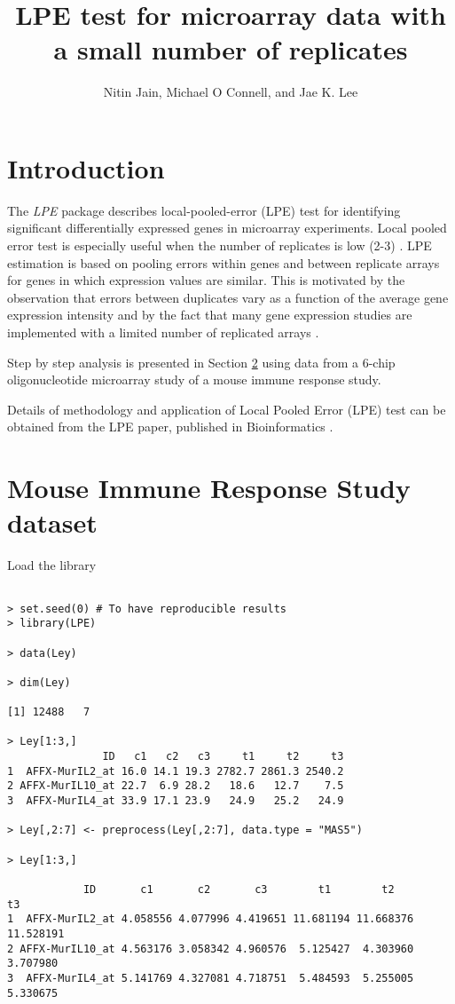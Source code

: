 \documentclass[12pt]{article}
\author{Nitin Jain, Michael O Connell, and Jae K. Lee}
\newcommand{\Rpackage}[1]{{\textit{#1}}}
\begin{document}
\title{LPE test for microarray data with a small number of replicates}

\maketitle
\tableofcontents

\section{Introduction}
The \Rpackage{LPE} package describes local-pooled-error (LPE) 
test for identifying significant differentially expressed 
genes in microarray experiments. Local pooled error test is
 especially useful when the number of replicates is low (2-3)
\cite{Jain:2003}.
 LPE estimation is based on pooling errors within
genes and between replicate arrays for genes in which expression
values are similar. This is motivated by the observation that
errors between duplicates vary as a function of the average gene
expression intensity and by the fact that many gene expression
studies are implemented with a limited number of replicated arrays
\cite{Chen:1997}.

Step by step analysis is presented in Section \ref{sec:analysis} 
using data from a 6-chip oligonucleotide microarray study of a mouse immune response study.

Details of methodology and application of Local Pooled Error (LPE) test 
can be obtained from the LPE paper, published in Bioinformatics
\cite{Jain:2003}.


\section{Mouse Immune Response Study dataset}
\label{sec:analysis}
Load the library
\begin{verbatim}

> set.seed(0) # To have reproducible results
> library(LPE) 

> data(Ley)

> dim(Ley)

[1] 12488	7

> Ley[1:3,]
               ID   c1   c2   c3     t1     t2     t3
1  AFFX-MurIL2_at 16.0 14.1 19.3 2782.7 2861.3 2540.2
2 AFFX-MurIL10_at 22.7  6.9 28.2   18.6   12.7    7.5
3  AFFX-MurIL4_at 33.9 17.1 23.9   24.9   25.2   24.9

> Ley[,2:7] <- preprocess(Ley[,2:7], data.type = "MAS5")

> Ley[1:3,]

            ID       c1       c2       c3        t1        t2        t3
1  AFFX-MurIL2_at 4.058556 4.077996 4.419651 11.681194 11.668376 11.528191
2 AFFX-MurIL10_at 4.563176 3.058342 4.960576  5.125427  4.303960  3.707980
3  AFFX-MurIL4_at 5.141769 4.327081 4.718751  5.484593  5.255005  5.330675


\end{verbatim}
\end{document}
